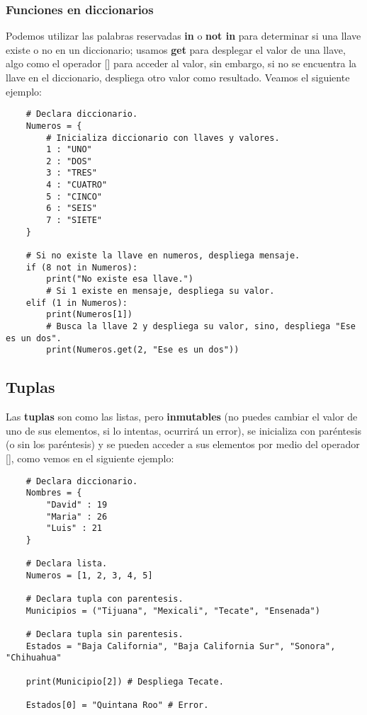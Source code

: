 \subsubsection{Funciones en diccionarios}

Podemos utilizar las palabras reservadas \textbf{in} o \textbf{not in} para determinar si una llave existe o no en un diccionario; usamos \textbf{get} para desplegar el valor de una llave, algo como el operador [] para acceder al valor, sin embargo, si no se encuentra la llave en el diccionario, despliega otro valor como resultado. Veamos el siguiente ejemplo:
\begin{lstlisting}
    # Declara diccionario.
    Numeros = {
        # Inicializa diccionario con llaves y valores.
        1 : "UNO"
        2 : "DOS"
        3 : "TRES"
        4 : "CUATRO"
        5 : "CINCO"
        6 : "SEIS"
        7 : "SIETE"
    }

    # Si no existe la llave en numeros, despliega mensaje.
    if (8 not in Numeros):
        print("No existe esa llave.")
        # Si 1 existe en mensaje, despliega su valor.
    elif (1 in Numeros):
        print(Numeros[1])
        # Busca la llave 2 y despliega su valor, sino, despliega "Ese es un dos".
        print(Numeros.get(2, "Ese es un dos"))
\end{lstlisting}


\subsection{Tuplas}

Las \textbf{tuplas} son como las listas, pero \textbf{inmutables} (no puedes cambiar el valor de uno de sus elementos, si lo intentas, ocurrirá un error), se inicializa con paréntesis (o sin los paréntesis) y se pueden acceder a sus elementos por medio del operador [], como vemos en el siguiente ejemplo:
\begin{lstlisting}
    # Declara diccionario.
    Nombres = {
        "David" : 19
        "Maria" : 26
        "Luis" : 21
    }
   
    # Declara lista.
    Numeros = [1, 2, 3, 4, 5]
   
    # Declara tupla con parentesis.
    Municipios = ("Tijuana", "Mexicali", "Tecate", "Ensenada")
   
    # Declara tupla sin parentesis.
    Estados = "Baja California", "Baja California Sur", "Sonora", "Chihuahua"
   
    print(Municipio[2]) # Despliega Tecate.
   
    Estados[0] = "Quintana Roo" # Error.
\end{lstlisting}

